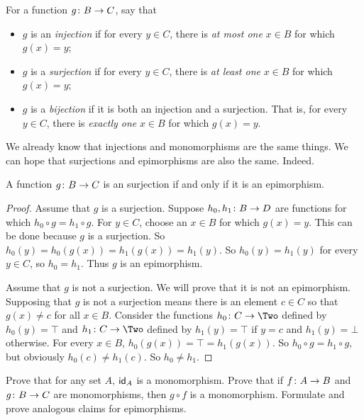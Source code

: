 \begin{defn}
	For a function ${g}\colon{B}\to{C}$, say that
	\begin{itemize}
		\item $g$ is an \emph{injection} if for every $y\in C$, there is \emph{at most one} $x\in B$ for which $g(x)=y$;
		\item $g$ is a \emph{surjection} if for every $y\in C$, there is \emph{at least one} $x\in B$ for which $g(x)=y$;
		\item $g$ is a \emph{bijection} if it is both an injection and a surjection. That is, for every $y\in C$, there is \emph{exactly one} $x\in B$ for which $g(x)=y$. 
	\end{itemize}  
\end{defn}

We already know that injections and monomorphisms are the same things. We can hope that surjections and epimorphisms are also the same. Indeed.

\begin{lemma}
	A function ${g}\colon{B}\to{C}$ is an surjection if and only if it is an epimorphism.
	\begin{proof}
		Assume that $g$ is a surjection. 
		Suppose ${h_0,h_1}\colon{B}\to{D}$ are functions for which $h_0\circ g = h_1\circ g$. 
		For $y\in C$, choose an $x\in B$ for which $g(x)=y$.
		This can be done because $g$ is a surjection.
		So $h_0(y) = h_0(g(x)) = h_1(g(x)) = h_1(y)$.
		So $h_0(y) = h_1(y)$ for every $y\in C$, so $h_0=h_1$.
		Thus $g$ is an epimorphism.
		
		Assume that $g$ is not a surjection.
		We will prove that it is not an epimorphism.
		Supposing that $g$ is not a surjection means there is an element $c\in C$ so that $g(x)\neq c$ for all $x\in B$. 
		Consider the functions $\fromto {h_0}C\Two$ defined by $h_0(y)=\top$ and $\fromto {h_1}C\Two$ defined by $h_1(y) = \top$ if $y=c$ and $h_1(y)=\bot$ otherwise.
		For every $x\in B$, $h_0(g(x)) = \top = h_1(g(x))$. So $h_0\circ g = h_1\circ g$, but obviously $h_0(c)\neq h_1(c)$. So $h_0\neq h_1$.  
	\end{proof}
\end{lemma}

\begin{exercises}
	Prove that for any set $A$, $\textsf{id}_A$ is a monomorphism.
	Prove that if ${f}\colon{A}\to{B}$ and ${g}\colon{B}\to{C}$ are monomorphisms, then $g\circ f$ is a monomorphism.
	Formulate and prove analogous claims for epimorphisms.
\end{exercises}

